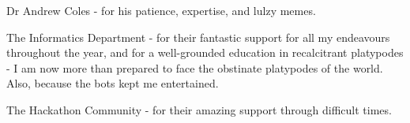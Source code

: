 Dr Andrew Coles - for his patience, expertise, and lulzy memes.
\vspace{2mm}

\par The Informatics Department - for their fantastic support for all my endeavours throughout the year, and for a well-grounded education in recalcitrant platypodes - I am now more than prepared to face the obstinate platypodes of the world. Also, because the bots kept me entertained.
\vspace{2mm}

\par The Hackathon Community - for their amazing support through difficult times.
